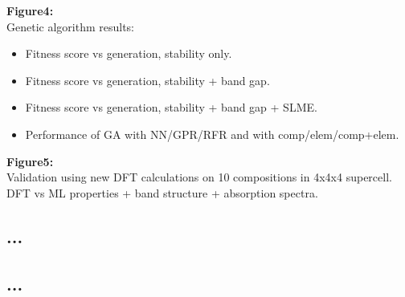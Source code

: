 \documentclass[aip, jmp, amsmath, amssymb, preprint]{revtex4-2}
\begin{document}
\textbf{Figure4:} \\
Genetic algorithm results: 
\begin{itemize}
\item Fitness score vs generation, stability only.
\item Fitness score vs generation, stability + band gap.
\item Fitness score vs generation, stability + band gap + SLME.
\item Performance of GA with NN/GPR/RFR and with comp/elem/comp+elem. \\
\end{itemize}

\textbf{Figure5:} \\
Validation using new DFT calculations on 10 compositions in 4x4x4 supercell. DFT vs ML properties + band structure + absorption spectra. \\


\subsection*{...}

\subsection*{...}
\end{document}
